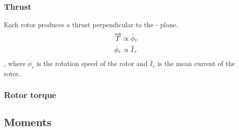 \subsubsection[Thrust]{Thrust  }
Each rotor produces a thrust perpendicular to the - plane.
\begin{align*}
\overrightarrow T &\propto \dot\phi_r\\
\dot{\phi}_r &\propto \overline{I}_r
\end{align*}
, where $\dot{\phi}_r$ is the rotation speed of the rotor and $\overline{I}_r$ is the mean current of the rotor.

\subsubsection[Rotor torque]{Rotor torque}

\subsection{Moments}

